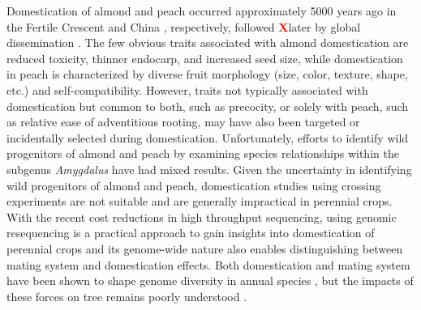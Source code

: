 \documentclass[12pt]{article}
\newcommand{\X}{\textcolor{red}{\bf X}}
\begin{document}

Domestication of almond and peach occurred approximately 5000 years ago in the Fertile Crescent and China \citep{zohary2012domestication}, respectively, followed \X later by global dissemination \citep{hedrick1917peaches, edwards1975almond, gradziel2011origin, zheng2014archaeological}. 
%
The few obvious traits associated with almond domestication are reduced toxicity, thinner endocarp, and increased seed size, while domestication in peach is characterized by diverse fruit morphology (size, color, texture, shape, etc.) and self-compatibility.
%
However, traits not typically associated with domestication but common to both, such as precocity, or solely with peach, such as relative ease of adventitious rooting, may have also been targeted or incidentally selected during domestication. 
%
Unfortunately, efforts to identify wild progenitors of almond and peach \citep{verde2013high, aradhya2004molecular, zeinalabedini2010origin, mowrey1990isozyme, browicz1996genus, ladizinsky1999origin, bassi20081} by examining species relationships within the subgenus \emph{Amygdalus} have had mixed results. 
%
Given the uncertainty in identifying wild progenitors of almond and peach, domestication studies using crossing experiments are not suitable and are generally impractical in perennial crops.
%
With the recent cost reductions in high throughput sequencing, using genomic resequencing is a practical approach to gain insights into domestication of perennial crops and its genome-wide nature also enables distinguishing between mating system and domestication effects. 
%
Both domestication and mating system have been shown to shape genome diversity in annual species \citep{glemin2006impact, doebley2006molecular, slotte2013capsella}, but the impacts of these forces on tree remains poorly understood \citep{mckey2010evolutionary, miller2011forest}.
\\
\end{document}
